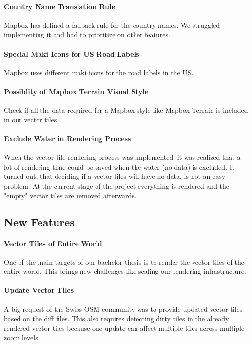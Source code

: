 \paragraph{Country Name Translation Rule}
Mapbox has defined a fallback rule\cite{22_mapbox.com_2015} for the country names. We struggled implementing it and had to prioritize on other features.

\paragraph{Special Maki Icons for US Road Labels}
Mapbox uses different maki icons\cite{101_mapbox.com_2015} for the road labels in the US.  

\paragraph{Possiblity of Mapbox Terrain Visual Style}
Check if all the data required for a Mapbox style like Mapbox Terrain\cite{102_mapbox.com_2015} is included in our vector tiles

\paragraph{Exclude Water in Rendering Process}

When the vector tile rendering process was implemented, it was realized that a lot of rendering time could be saved
when the water (no data) is excluded.
It turned out, that deciding if a vector tiles will have no data, is not an easy problem. At the current stage of the project
everything is rendered and the "empty" vector tiles are removed afterwards.

\subsection{New Features}\label{new_features}

\paragraph{Vector Tiles of Entire World}
One of the main targets of our bachelor thesis is to render the vector tiles of the entire world. This brings new challenges like scaling our rendering infrastructure. 

\paragraph{Update Vector Tiles}
A big request of the Swiss OSM community was to provide updated vector tiles based on the diff\cite{5_wiki.openstreetmap.org_2015} files.
This also requires detecting dirty tiles in the already rendered vector tiles because one update can affect multiple tiles across multiple zoom levels.


